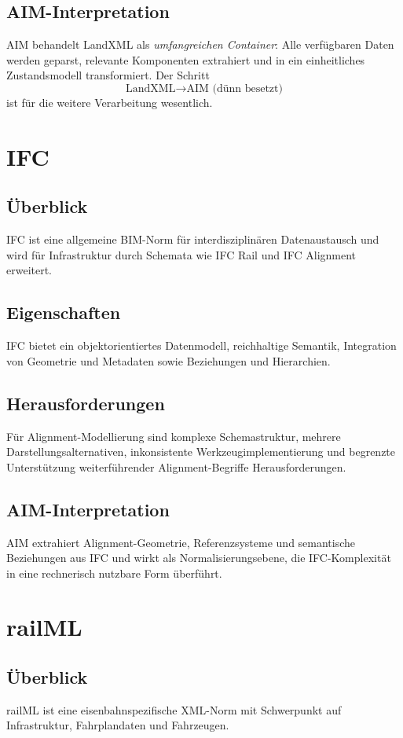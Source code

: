 \subsection{AIM-Interpretation}
AIM behandelt LandXML als \emph{umfangreichen Container}: Alle verfügbaren
Daten werden geparst, relevante Komponenten extrahiert und in ein einheitliches
Zustandsmodell transformiert. Der Schritt
\[
\text{LandXML}\rightarrow\text{AIM (dünn besetzt)}
\]
ist für die weitere Verarbeitung wesentlich.

\section{IFC}
\subsection{Überblick}
IFC ist eine allgemeine BIM-Norm für interdisziplinären Datenaustausch und wird
für Infrastruktur durch Schemata wie IFC Rail und IFC Alignment erweitert.

\subsection{Eigenschaften}
IFC bietet ein objektorientiertes Datenmodell, reichhaltige Semantik,
Integration von Geometrie und Metadaten sowie Beziehungen und Hierarchien.

\subsection{Herausforderungen}
Für Alignment-Modellierung sind komplexe Schemastruktur, mehrere
Darstellungsalternativen, inkonsistente Werkzeugimplementierung und begrenzte
Unterstützung weiterführender Alignment-Begriffe Herausforderungen.

\subsection{AIM-Interpretation}
AIM extrahiert Alignment-Geometrie, Referenzsysteme und semantische Beziehungen
aus IFC und wirkt als Normalisierungsebene, die IFC-Komplexität in eine
rechnerisch nutzbare Form überführt.

\section{railML}
\subsection{Überblick}
railML ist eine eisenbahnspezifische XML-Norm mit Schwerpunkt auf
Infrastruktur, Fahrplandaten und Fahrzeugen.

